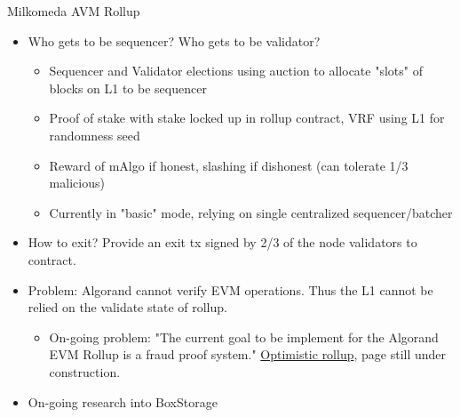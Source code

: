\documentclass[aspectratio=169,xcolor=dvipsnames]{beamer}
\begin{document}
\begin{frame}{Milkomeda AVM Rollup}
\begin{itemize}
    \item Who gets to be sequencer? Who gets to be validator?
    \begin{itemize}
        \item Sequencer and Validator elections using auction to allocate "slots" of blocks on L1 to be sequencer
        \item Proof of stake with stake locked up in rollup contract, VRF using L1 for randomness seed
        \item Reward of mAlgo if honest, slashing if dishonest (can tolerate 1/3 malicious)
        \item Currently in "basic" mode, relying on single centralized sequencer/batcher
    \end{itemize}
    \item How to exit? Provide an exit tx signed by 2/3 of the node validators to contract.
    \item Problem: Algorand cannot verify EVM operations. Thus the L1 cannot be relied on the validate state of rollup.
    \begin{itemize}
        \item On-going problem: "The current goal to be implement for the Algorand EVM Rollup is a fraud proof system." \href{https://docs.milkomeda.com/algorand/how-it-works/optimistic-rollup}{Optimistic rollup}, page still under construction.
    \end{itemize}
    \item On-going research into BoxStorage
\end{itemize}
\end{frame}
\end{document}

